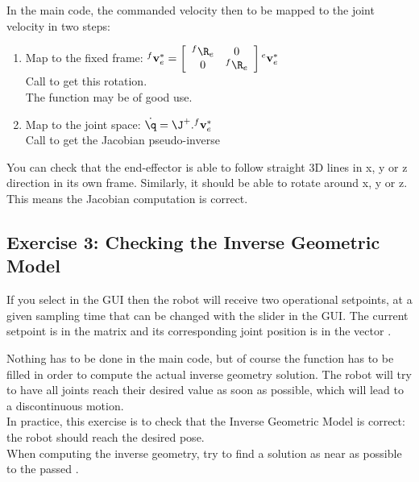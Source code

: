 \documentclass{ecnreport}
\begin{document}
  
  In the main code, the commanded velocity then to be mapped to the joint velocity in two steps:
  \begin{enumerate}
    \item Map to the fixed frame: ${}^f\mathbf{v}_e^* = \left[\begin{array}{cc}{}^f\R_e & 0 \\ 0 & {}^f\R_e\end{array}\right]{}^e\mathbf{v}_e^*$\\
    Call  to get this rotation.\\
    The  function may be of good use.
    \item Map to the joint space: $\dot\q = \J^+.{}^f\mathbf{v}_e^*$\\
    Call  to get the Jacobian pseudo-inverse
  \end{enumerate}
  You can check that the end-effector is able to follow straight 3D lines in x, y or z direction in its own frame.
  Similarly, it should be able to rotate around x, y or z. This means the Jacobian computation is correct.
  
  \newpage
  \subsection*{Exercise 3: Checking the Inverse Geometric Model}
  
  If you select  in the GUI then the robot will receive two operational setpoints, at a given sampling time that can be changed with the  slider in the GUI. The current setpoint is in the matrix  and its corresponding joint position is in the vector .
  
  Nothing has to be done in the main code, but of course the  function has to be filled in order to compute the actual inverse geometry solution. The robot will try to have all joints reach their desired value as soon as possible, which will lead to a discontinuous motion.\\
  
  In practice, this exercise is to check that the Inverse Geometric Model is correct: the robot should reach the desired pose.\\
  
  When computing the inverse geometry, try to find a solution as near as possible to the passed .\\
  
\end{document}
